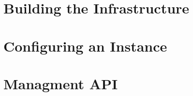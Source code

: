 \documentclass[draft=false,
10pt, %
a4paper, %
oneside, %
headinclude,footinclude, %
]{scrartcl}
\begin{document}

\section{Building the Infrastructure}\label{section:infrastructure}



\section{Configuring an Instance}\label{section:instance}




\section{Managment API}



\renewcommand{\refname}{\spacedlowsmallcaps{References}} %




\end{document}
